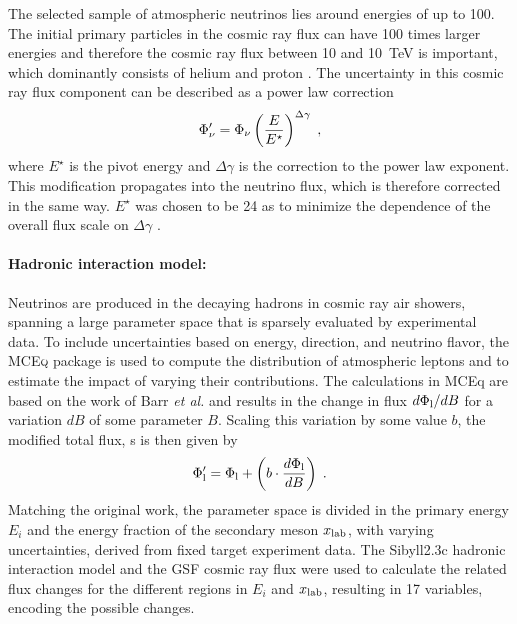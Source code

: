 The selected sample of atmospheric neutrinos lies around energies of up to \SI{100}{\gev}. The initial primary particles in the cosmic ray flux can have 100 times larger energies and therefore the cosmic ray flux between \SI{10}{\gev} and \SI{10}{\tera\electronvolt} is important, which dominantly consists of helium and proton . The uncertainty in this cosmic ray flux component can be described as a power law correction 
\begin{equation}
    \Phi^\prime_\nu = \Phi_\nu \left( \frac{E}{E^\star} \right)^{\Delta\gamma}
    \;,
    \labeq{power_law_flux_uncertainty}
\end{equation}
where $E^\star$ is the pivot energy and $\Delta\gamma$ is the correction to the power law exponent. This modification propagates into the neutrino flux, which is therefore corrected in the same way. $E^\star$ was chosen to be \SI{24}{\gev} as to minimize the dependence of the overall flux scale on $\Delta\gamma$ .


\paragraph{Hadronic interaction model:}

Neutrinos are produced in the decaying hadrons in cosmic ray air showers, spanning a large parameter space that is sparsely evaluated by experimental data. To include uncertainties based on energy, direction, and neutrino flavor, the \textsc{MCEq} package  is used to compute the distribution of atmospheric leptons and to estimate the impact of varying their contributions. The calculations in MCEq are based on the work of Barr \textit{et al.}  and results in the change in flux $d\Phi_\rm{l}/dB$ for a variation $dB$ of some parameter $B$. Scaling this variation by some value $b$, the modified total flux, s is then given by
\begin{equation}
    \Phi^\prime_\rm{l} = \Phi_\rm{l} + \left( b \cdot \frac{d\Phi_\rm{l}}{dB} \right)
    \;.
    \labeq{mceq_flux_variations}
\end{equation}
Matching the original work, the parameter space is divided in the primary energy $E_i$ and the energy fraction of the secondary meson $x_\rm{lab}$, with varying uncertainties, derived from fixed target experiment data. The Sibyll2.3c  hadronic interaction model and the GSF cosmic ray flux  were used to calculate the related flux changes for the different regions in $E_i$ and $x_\rm{lab}$, resulting in 17 variables, encoding the possible changes.


